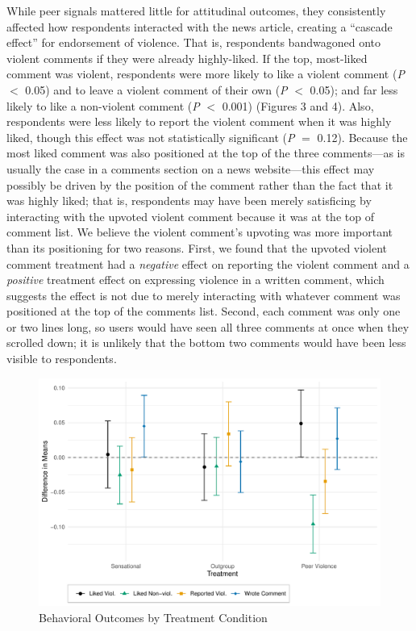 While peer signals mattered little for attitudinal outcomes, they consistently affected how respondents interacted with the news article, creating a ``cascade effect'' \citep{bikhchandani1992theory} for endorsement of violence. That is, respondents bandwagoned onto violent comments if they were already highly-liked. If the top, most-liked comment was violent, respondents were more likely to like a violent comment (\textit{P} $<$ 0.05) and to leave a violent comment of their own (\textit{P} $<$ 0.05); and far less likely to like a non-violent comment (\textit{P} $<$ 0.001) (Figures 3 and 4). Also, respondents were less likely to report the violent comment when it was highly liked, though this effect was not statistically significant (\textit{P} $=$ 0.12). Because the most liked comment was also positioned at the top of the three comments---as is usually the case in a comments section on a news website---this effect may possibly be driven by the position of the comment rather than the fact that it was highly liked; that is, respondents may have been merely satisficing by interacting with the upvoted violent comment because it was at the top of comment list. We believe the violent comment's upvoting was more important than its positioning for two reasons. First, we found that the upvoted violent comment treatment had a \textit{negative} effect on reporting the violent comment and a \textit{positive} treatment effect on expressing violence in a written comment, which suggests the effect is not due to merely interacting with whatever comment was positioned at the top of the comments list. Second, each comment was only one or two lines long, so users would have seen all three comments at once when they scrolled down; it is unlikely that the bottom two comments would have been less visible to respondents.

\begin{figure}[!htbp]
  \centering
  \caption{Behavioral Outcomes by Treatment Condition}
  \includegraphics[width=.835\textwidth]{figures/ATE_behavioral.pdf}
\end{figure}


